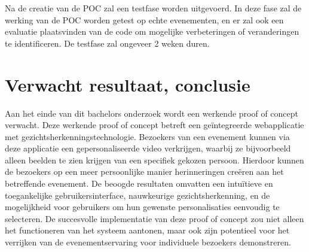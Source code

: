 Na de creatie van de POC zal een testfase worden uitgevoerd.
In deze fase zal de werking van de POC worden getest op echte evenementen,
en er zal ook een evaluatie plaatsvinden van de code om mogelijke verbeteringen of veranderingen te identificeren.
De testfase zal ongeveer 2 weken duren.

\section{Verwacht resultaat, conclusie}%
\label{sec:verwachte_resultaten}
Aan het einde van dit bachelors onderzoek wordt een werkende proof of concept verwacht. Deze werkende proof of concept betreft een geïntegreerde webapplicatie met gezichtsherkenningstechnologie. Bezoekers van een evenement kunnen via deze applicatie een gepersonaliseerde video verkrijgen, waarbij ze bijvoorbeeld alleen beelden te zien krijgen van een specifiek gekozen persoon. Hierdoor kunnen de bezoekers op een meer persoonlijke manier herinneringen creëren aan het betreffende evenement. De beoogde resultaten omvatten een intuïtieve en toegankelijke gebruikersinterface, nauwkeurige gezichtsherkenning, en de mogelijkheid voor gebruikers om hun gewenste personalisaties eenvoudig te selecteren. De succesvolle implementatie van deze proof of concept zou niet alleen het functioneren van het systeem aantonen, maar ook zijn potentieel voor het verrijken van de evenementservaring voor individuele bezoekers demonstreren.

